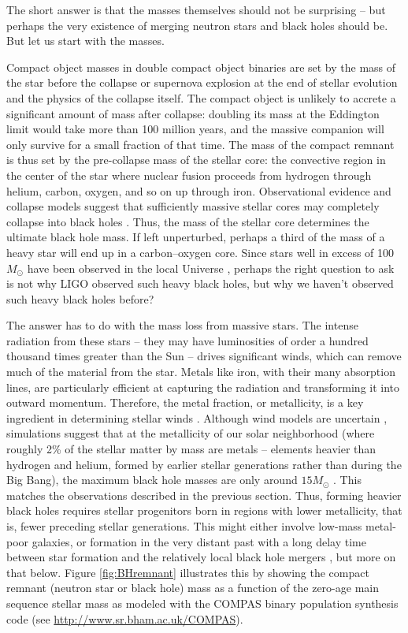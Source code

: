 \documentclass[iop,onecolumn]{revtex4}
\begin{document}
The short answer is that the masses themselves should not be surprising -- but perhaps the very existence of merging neutron stars and black holes should be.  But let us start with the masses.  

Compact object masses in double compact object binaries are set by the mass of the star before the collapse or supernova explosion at the end of stellar evolution and the physics of the collapse itself.  The compact object is unlikely to accrete a significant amount of mass after collapse: doubling its mass at the Eddington limit would take more than 100 million years, and the massive companion will only survive for a small fraction of that time.  The mass of the compact remnant is thus set by the pre-collapse mass of the stellar core: the convective region in the center of the star where nuclear fusion proceeds from hydrogen through helium, carbon, oxygen, and so on up through iron.  Observational evidence and collapse models suggest that sufficiently massive stellar cores may completely collapse into black holes \citep[for a review, see][]{Mirabel:2016}.  Thus, the mass of the stellar core determines the ultimate black hole mass.  If left unperturbed, perhaps a third of the mass of a heavy star will end up in a carbon--oxygen core.  Since stars well in excess of 100 $M_\odot$ have been observed in the local Universe \citep[e.g.,][]{Schneider:2018}, perhaps the right question to ask is not why LIGO observed such heavy black holes, but why we haven't observed such heavy black holes before?  

The answer has to do with the mass loss from massive stars.  The intense radiation from these stars -- they may have luminosities of order a hundred thousand times greater than the Sun -- drives significant winds, which can remove much of the material from the star.  Metals like iron, with their many absorption lines, are particularly efficient at capturing the radiation and transforming it into outward momentum.  Therefore, the metal fraction, or metallicity, is a key ingredient in determining stellar winds \citep{Vink:2001}.  Although wind models are uncertain \citep[e.g.,][]{Renzo:2017}, simulations suggest that at the metallicity of our solar neighborhood (where roughly 2\% of the stellar matter by mass are metals -- elements heavier than hydrogen and helium, formed by earlier stellar generations rather than during the Big Bang), the maximum black hole masses are only around $15 M_\odot$ \citep{Belczynski:2009,Spera:2015}.  This matches the observations described in the previous section.  Thus, forming heavier black holes requires stellar progenitors born in regions with lower metallicity, that is, fewer preceding stellar generations.  This might either involve low-mass metal-poor galaxies, or formation in the very distant past with a long delay time between star formation and the relatively local black hole mergers \citep{Belczynski:2016}, but more on that below.  Figure \ref{fig:BHremnant} illustrates this by showing the compact remnant (neutron star or black hole) mass as a function of the zero-age main sequence stellar mass as modeled with the COMPAS binary population synthesis code (see \url{http://www.sr.bham.ac.uk/COMPAS}).
\end{document}
